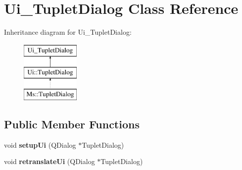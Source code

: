 \hypertarget{class_ui___tuplet_dialog}{}\section{Ui\+\_\+\+Tuplet\+Dialog Class Reference}
\label{class_ui___tuplet_dialog}
Inheritance diagram for Ui\+\_\+\+Tuplet\+Dialog\+:\begin{figure}[H]
\begin{center}
\leavevmode
\includegraphics[height=3.000000cm]{class_ui___tuplet_dialog}
\end{center}
\end{figure}
\subsection*{Public Member Functions}
\begin{DoxyCompactItemize}
\item 
\mbox{\label{class_ui___tuplet_dialog_a3ec68ebee4c263f93aea82c551743871}} 
void {\bfseries setup\+Ui} (Q\+Dialog $\ast$Tuplet\+Dialog)
\item 
\mbox{\label{class_ui___tuplet_dialog_ad3499bfada9dd1aa610e626b108a8336}} 
void {\bfseries retranslate\+Ui} (Q\+Dialog $\ast$Tuplet\+Dialog)
\end{DoxyCompactItemize}
